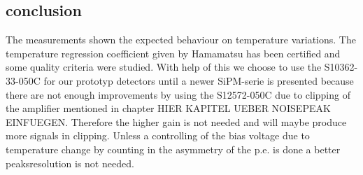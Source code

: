 \subsection{conclusion}
The measurements shown the expected behaviour on temperature variations. The temperature regression coefficient given by Hamamatsu has been certified and some quality criteria were studied. With help of this we choose to use the S10362-33-050C for our prototyp detectors until a newer SiPM-serie is presented because there are not enough improvements by using the S12572-050C due to clipping of the amplifier mentioned in chapter HIER KAPITEL UEBER NOISEPEAK EINFUEGEN. Therefore the higher gain is not needed and will maybe produce more signals in clipping. Unless a controlling of the bias voltage due to temperature change by counting in the asymmetry of the p.e. is done a better peaksresolution is not needed.
